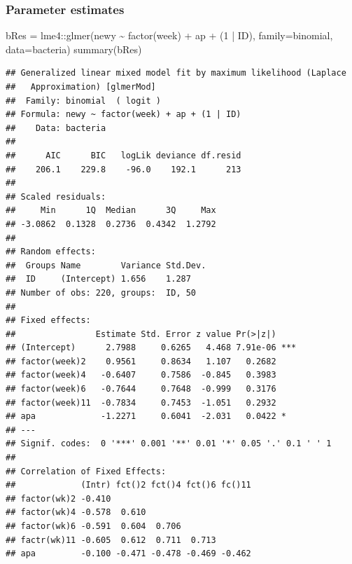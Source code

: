 \documentclass[
  openany]{book}
\newenvironment{Shaded}{\begin{snugshade}}{\end{snugshade}}
\newcommand{\AttributeTok}[1]{\textcolor[rgb]{0.77,0.63,0.00}{#1}}
\newcommand{\DecValTok}[1]{\textcolor[rgb]{0.00,0.00,0.81}{#1}}
\newcommand{\FunctionTok}[1]{\textcolor[rgb]{0.00,0.00,0.00}{#1}}
\newcommand{\NormalTok}[1]{#1}
\newcommand{\OtherTok}[1]{\textcolor[rgb]{0.56,0.35,0.01}{#1}}
\newcommand{\SpecialCharTok}[1]{\textcolor[rgb]{0.00,0.00,0.00}{#1}}
\newcommand{\StringTok}[1]{\textcolor[rgb]{0.31,0.60,0.02}{#1}}
\begin{document}
\hypertarget{parameter-estimates}{%
\subsubsection{Parameter estimates}\label{parameter-estimates}}

\begin{Shaded}
\begin{Highlighting}[]
\NormalTok{bRes }\OtherTok{=}\NormalTok{ lme4}\SpecialCharTok{::}\FunctionTok{glmer}\NormalTok{(newy }\SpecialCharTok{\textasciitilde{}} \FunctionTok{factor}\NormalTok{(week) }\SpecialCharTok{+}\NormalTok{ ap }\SpecialCharTok{+}\NormalTok{ (}\DecValTok{1} \SpecialCharTok{|}\NormalTok{ ID), }
        \AttributeTok{family=}\StringTok{\textquotesingle{}binomial\textquotesingle{}}\NormalTok{, }\AttributeTok{data=}\NormalTok{bacteria)}
\FunctionTok{summary}\NormalTok{(bRes)}
\end{Highlighting}
\end{Shaded}

\begin{verbatim}
## Generalized linear mixed model fit by maximum likelihood (Laplace
##   Approximation) [glmerMod]
##  Family: binomial  ( logit )
## Formula: newy ~ factor(week) + ap + (1 | ID)
##    Data: bacteria
## 
##      AIC      BIC   logLik deviance df.resid 
##    206.1    229.8    -96.0    192.1      213 
## 
## Scaled residuals: 
##     Min      1Q  Median      3Q     Max 
## -3.0862  0.1328  0.2736  0.4342  1.2792 
## 
## Random effects:
##  Groups Name        Variance Std.Dev.
##  ID     (Intercept) 1.656    1.287   
## Number of obs: 220, groups:  ID, 50
## 
## Fixed effects:
##                Estimate Std. Error z value Pr(>|z|)    
## (Intercept)      2.7988     0.6265   4.468 7.91e-06 ***
## factor(week)2    0.9561     0.8634   1.107   0.2682    
## factor(week)4   -0.6407     0.7586  -0.845   0.3983    
## factor(week)6   -0.7644     0.7648  -0.999   0.3176    
## factor(week)11  -0.7834     0.7453  -1.051   0.2932    
## apa             -1.2271     0.6041  -2.031   0.0422 *  
## ---
## Signif. codes:  0 '***' 0.001 '**' 0.01 '*' 0.05 '.' 0.1 ' ' 1
## 
## Correlation of Fixed Effects:
##             (Intr) fct()2 fct()4 fct()6 fc()11
## factor(wk)2 -0.410                            
## factor(wk)4 -0.578  0.610                     
## factor(wk)6 -0.591  0.604  0.706              
## factr(wk)11 -0.605  0.612  0.711  0.713       
## apa         -0.100 -0.471 -0.478 -0.469 -0.462
\end{verbatim}
\end{document}
